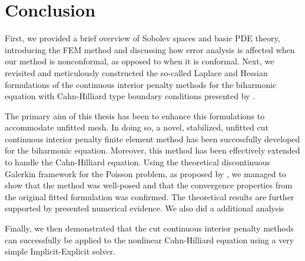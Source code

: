 \documentclass[11pt]{article}
\theoremstyle{remark}
\numberwithin{equation}{section}
\begin{document}
\newpage
\section{Conclusion}%
\label{sec:conclusion}

First, we provided a brief overview of Sobolev spaces and basic PDE theory, introducing the FEM method and discussing how error analysis is affected when our method is nonconformal, as opposed to when it is conformal.
Next, we revisited and meticulously constructed the so-called Laplace and Hessian formulations of the continuous interior penalty methods for the biharmonic equation with Cahn-Hilliard type boundary conditions presented by \cite{brenner2012, feng2007fully}.

The primary aim of this thesis has been to enhance this formulations to accommodate unfitted mesh. In doing so, a novel, stabilized, unfitted cut continuous interior penalty finite element method has been successfully developed for the biharmonic equation. Moreover, this method has been effectively extended to handle the Cahn-Hilliard equation.
Using the theoretical discontinuous Galerkin framework for the Poisson problem, as proposed by \cite{gurkan2019stabilized}, we managed to show that the method was
well-posed and that the convergence properties from the original fitted formulation was confirmed. The theoretical results are further supported by presented numerical evidence. We also did a additional analysis

Finally, we then demonstrated that the cut continuous interior penalty methods can successfully be applied to the nonlinear Cahn-Hilliard equation using a very simple Implicit-Explicit solver.

    \printbibliography

    
\end{document}
